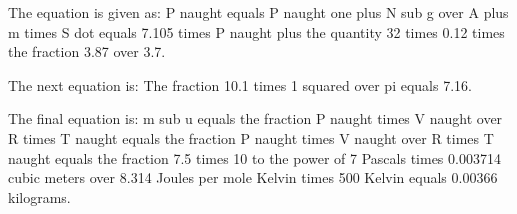 The equation is given as:
P naught equals P naught one plus N sub g over A plus m times S dot equals 7.105 times P naught plus the quantity 32 times 0.12 times the fraction 3.87 over 3.7.

The next equation is:
The fraction 10.1 times 1 squared over pi equals 7.16.

The final equation is:
m sub u equals the fraction P naught times V naught over R times T naught equals the fraction P naught times V naught over R times T naught equals the fraction 7.5 times 10 to the power of 7 Pascals times 0.003714 cubic meters over 8.314 Joules per mole Kelvin times 500 Kelvin equals 0.00366 kilograms.